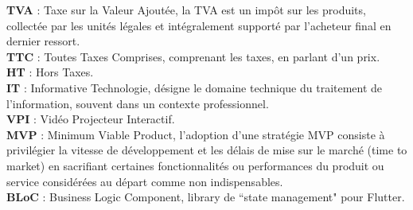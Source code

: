 \textbf{TVA} : Taxe sur la Valeur Ajoutée, la TVA est un impôt sur les produits, collectée par les unités légales et intégralement supporté par l'acheteur final en dernier ressort.\cite{TVA}
\hfill \\

\textbf{TTC} :  Toutes Taxes Comprises, comprenant les taxes, en parlant d’un prix.\cite{TTC}
\hfill \\

\textbf{HT} : Hors Taxes.
\hfill \\

\textbf{IT} : Informative Technologie, désigne le domaine technique du traitement de l'information, souvent dans un contexte professionnel.\cite{frwiki:183031578}
\hfill \\

\textbf{VPI} : Vidéo Projecteur Interactif.
\hfill \\

\textbf{MVP} : Minimum Viable Product, l'adoption d'une stratégie MVP consiste à privilégier la vitesse de développement et les délais de mise sur le marché (time to market) en sacrifiant certaines fonctionnalités ou performances du produit ou service considérées au départ comme non indispensables.\cite{MVP}
\hfill \\

\textbf{BLoC} : Business Logic Component, library de “state management" pour Flutter.\cite{BLoC}